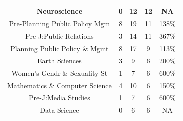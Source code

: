 \documentclass[10pt]{article}
\begin{document}
\begin{longtable}[c]{|ccccc|}
	\multicolumn{1}{|c|}{Neuroscience}                               & \multicolumn{1}{c|}{0}                               & \multicolumn{1}{c|}{12}                                  & \multicolumn{1}{c|}{12}                 & NA                    \\ \hline
	\multicolumn{1}{|c|}{Pre-Planning Public Policy Mgm}             & \multicolumn{1}{c|}{8}                               & \multicolumn{1}{c|}{19}                                  & \multicolumn{1}{c|}{11}                 & 138\%                 \\ \hline
	\multicolumn{1}{|c|}{Pre-J:Public Relations}                     & \multicolumn{1}{c|}{3}                               & \multicolumn{1}{c|}{14}                                  & \multicolumn{1}{c|}{11}                 & 367\%                 \\ \hline
	\multicolumn{1}{|c|}{Planning Public Policy \& Mgmt}             & \multicolumn{1}{c|}{8}                               & \multicolumn{1}{c|}{17}                                  & \multicolumn{1}{c|}{9}                  & 113\%                 \\ \hline
	\multicolumn{1}{|c|}{Earth Sciences}                             & \multicolumn{1}{c|}{3}                               & \multicolumn{1}{c|}{9}                                   & \multicolumn{1}{c|}{6}                  & 200\%                 \\ \hline
	\multicolumn{1}{|c|}{Women's Gendr \& Sexuality St}              & \multicolumn{1}{c|}{1}                               & \multicolumn{1}{c|}{7}                                   & \multicolumn{1}{c|}{6}                  & 600\%                 \\ \hline
	\multicolumn{1}{|c|}{Mathematics \& Computer Science}            & \multicolumn{1}{c|}{4}                               & \multicolumn{1}{c|}{10}                                  & \multicolumn{1}{c|}{6}                  & 150\%                 \\ \hline
	\multicolumn{1}{|c|}{Pre-J:Media Studies}                        & \multicolumn{1}{c|}{1}                               & \multicolumn{1}{c|}{7}                                   & \multicolumn{1}{c|}{6}                  & 600\%                 \\ \hline
	\multicolumn{1}{|c|}{Data Science}                               & \multicolumn{1}{c|}{0}                               & \multicolumn{1}{c|}{6}                                   & \multicolumn{1}{c|}{6}                  & NA                    \\ \hline

\end{longtable}
\end{document}
